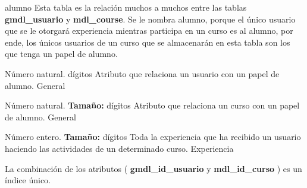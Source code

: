     \begin{Entidad}
        {alumno}
            {Esta tabla es la relación muchos a muchos entre las tablas \textbf{gmdl\_usuario} y \textbf{mdl\_course}. Se le nombra alumno, porque el único usuario que se le otorgará experiencia mientras participa en un curso es al alumno, por ende, los únicos usuarios de un curso que se almacenarán en esta tabla son los que tenga un papel de alumno.\\}
            
            {Número \newline natural.  dígitos}
            {Atributo que relaciona un usuario con un papel de alumno. }
                {%
                }
            {General}
            
            {Número \newline natural. \newline \textbf{Tamaño:} dígitos}
            {Atributo que relaciona un curso con un papel de alumno.}
                {
                }
            {General}
            
            {Número \newline entero. \newline \textbf{Tamaño:} dígitos}
            {Toda la experiencia que ha recibido un usuario haciendo las actividades de un determinado curso.}
                {
                }
            {Experiencia}
            
            
    \end{Entidad}

        
    \noindent La combinación de los atributos ( \textbf{gmdl\_id\_usuario } y \textbf{mdl\_id\_curso} ) es un índice único. 
            

    
\clearpage
    
